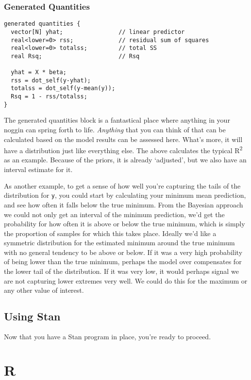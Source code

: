 \documentclass[]{book}
\begin{document}
\subsection{Generated Quantities}\label{generated-quantities}

\begin{verbatim}
generated quantities {
  vector[N] yhat;                // linear predictor
  real<lower=0> rss;             // residual sum of squares
  real<lower=0> totalss;         // total SS              
  real Rsq;                      // Rsq
  
  yhat = X * beta;
  rss = dot_self(y-yhat);
  totalss = dot_self(y-mean(y));
  Rsq = 1 - rss/totalss;
}
\end{verbatim}

The {generated quantities} block is a fantastical place where anything
in your noggin can spring forth to life. \emph{Anything} that you can
think of that can be calculated based on the model results can be
assessed here. What's more, it will have a distribution just like
everything else. The above calculates the typical R\textsuperscript{2}
as an example. Because of the priors, it is already `adjusted', but we
also have an interval estimate for it.

As another example, to get a sense of how well you're capturing the
tails of the distribution for \texttt{y}, you could start by calculating
your minimum mean prediction, and see how often it falls below the true
minimum. From the Bayesian approach we could not only get an interval of
the minimum prediction, we'd get the probability for how often it is
above or below the true minimum, which is simply the proportion of
samples for which this takes place. Ideally we'd like a symmetric
distribution for the estimated minimum around the true minimum with no
general tendency to be above or below. If it was a very high probability
of being lower than the true minimum, perhaps the model over compensates
for the lower tail of the distribution. If it was very low, it would
perhaps signal we are not capturing lower extremes very well. We could
do this for the maximum or any other value of interest.

\section{Using Stan}\label{using-stan}

Now that you have a Stan program in place, you're ready to proceed.

\chapter{R}\label{r}
\end{document}
